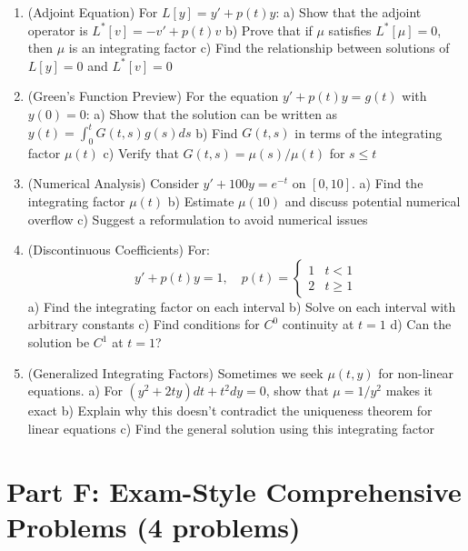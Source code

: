 \documentclass[12pt]{article}
\begin{document}
\begin{enumerate}[resume]
\item (Adjoint Equation) For $L[y] = y' + p(t)y$:
   a) Show that the adjoint operator is $L^*[v] = -v' + p(t)v$
   b) Prove that if $\mu$ satisfies $L^*[\mu] = 0$, then $\mu$ is an integrating factor
   c) Find the relationship between solutions of $L[y] = 0$ and $L^*[v] = 0$

\item (Green's Function Preview) For the equation $y' + p(t)y = g(t)$ with $y(0) = 0$:
   a) Show that the solution can be written as $y(t) = \int_0^t G(t,s)g(s)ds$
   b) Find $G(t,s)$ in terms of the integrating factor $\mu(t)$
   c) Verify that $G(t,s) = \mu(s)/\mu(t)$ for $s \leq t$

\item (Numerical Analysis) Consider $y' + 100y = e^{-t}$ on $[0, 10]$.
   a) Find the integrating factor $\mu(t)$
   b) Estimate $\mu(10)$ and discuss potential numerical overflow
   c) Suggest a reformulation to avoid numerical issues

\item (Discontinuous Coefficients) For:
\begin{equation}
y' + p(t)y = 1, \quad p(t) = \begin{cases} 1 & t < 1 \\ 2 & t \geq 1 \end{cases}
\end{equation}
   a) Find the integrating factor on each interval
   b) Solve on each interval with arbitrary constants
   c) Find conditions for $C^0$ continuity at $t = 1$
   d) Can the solution be $C^1$ at $t = 1$?

\item (Generalized Integrating Factors) Sometimes we seek $\mu(t,y)$ for non-linear equations.
   a) For $(y^2 + 2ty)dt + t^2dy = 0$, show that $\mu = 1/y^2$ makes it exact
   b) Explain why this doesn't contradict the uniqueness theorem for linear equations
   c) Find the general solution using this integrating factor
\end{enumerate}

\section*{Part F: Exam-Style Comprehensive Problems (4 problems)}
\end{document}
